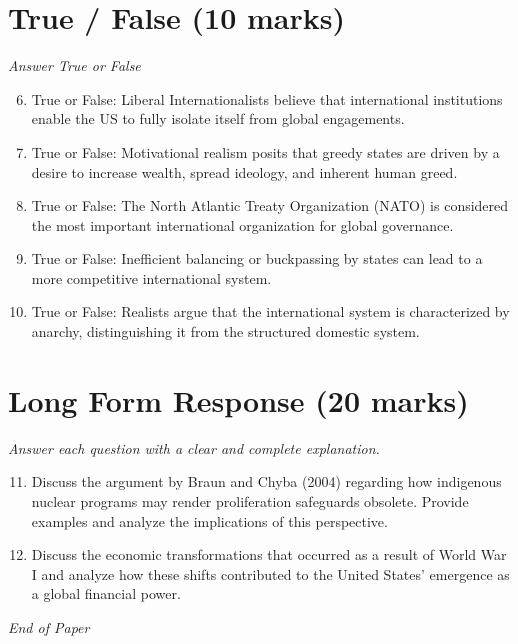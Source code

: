 \documentclass[12pt]{article}
\begin{document}
\section*{True / False (10 marks)}
\textit{Answer True or False}
\begin{enumerate}[label=\arabic*.]
\setcounter{enumi}{5}
\item True or False: Liberal Internationalists believe that international institutions enable the US to fully isolate itself from global engagements.
\item True or False: Motivational realism posits that greedy states are driven by a desire to increase wealth, spread ideology, and inherent human greed.
\item True or False: The North Atlantic Treaty Organization (NATO) is considered the most important international organization for global governance.
\item True or False: Inefficient balancing or buckpassing by states can lead to a more competitive international system.
\item True or False: Realists argue that the international system is characterized by anarchy, distinguishing it from the structured domestic system.
\end{enumerate}

\section*{Long Form Response (20 marks)}
\textit{Answer each question with a clear and complete explanation.}
\begin{enumerate}[label=\arabic*.]
\setcounter{enumi}{10}
\item Discuss the argument by Braun and Chyba (2004) regarding how indigenous nuclear programs may render proliferation safeguards obsolete. Provide examples and analyze the implications of this perspective.
\item Discuss the economic transformations that occurred as a result of World War I and analyze how these shifts contributed to the United States' emergence as a global financial power.
\end{enumerate}

\vfill
\noindent\textit{End of Paper}
\end{document}
